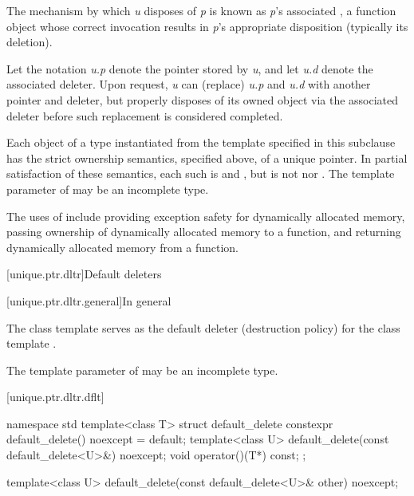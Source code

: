 \pnum
The mechanism by which \textit{u} disposes of \textit{p} is known as
\textit{p}'s associated , a function object whose correct
invocation results in \textit{p}'s appropriate disposition (typically its deletion).

\pnum
Let the notation \textit{u.p} denote the pointer stored by \textit{u}, and
let \textit{u.d} denote the associated deleter. Upon request, \textit{u} can
 (replace) \textit{u.p} and \textit{u.d} with another pointer and
deleter, but properly disposes of its owned object via the associated
deleter before such replacement is considered completed.

\pnum
Each object of a type  instantiated from the  template
specified in this subclause has the strict ownership semantics, specified above,
of a unique pointer. In partial satisfaction of these semantics, each such 
is  and , but is not
 nor .
The template parameter  of  may be an incomplete type.

\pnum
\begin{note} The uses
of  include providing exception safety for
dynamically allocated memory, passing ownership of dynamically allocated
memory to a function, and returning dynamically allocated memory from a
function. \end{note}

[unique.ptr.dltr]{Default deleters}

[unique.ptr.dltr.general]{In general}

\pnum
The class template  serves as the default deleter (destruction policy)
for the class template .

\pnum
The template parameter  of  may be
an incomplete type.

[unique.ptr.dltr.dflt]{}

\begin{codeblock}
namespace std {
  template<class T> struct default_delete {
    constexpr default_delete() noexcept = default;
    template<class U> default_delete(const default_delete<U>&) noexcept;
    void operator()(T*) const;
  };
}
\end{codeblock}

%
\begin{itemdecl}
template<class U> default_delete(const default_delete<U>& other) noexcept;
\end{itemdecl}

